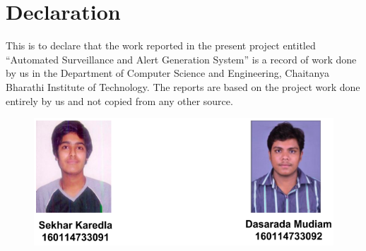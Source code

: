 \cleardoublepage
{}
{}
\chapter*{Declaration}
This is to declare that the work reported in the present project entitled “Automated Surveillance and Alert Generation System” is a record of work done by us in the Department of Computer Science and Engineering, Chaitanya Bharathi Institute of Technology. The reports are based on the project work done entirely by us and not copied from any other source.

\begin{figure}[H]
\centering
\includegraphics[width = \linewidth]{91_92.png}
\end{figure}

\newpage
